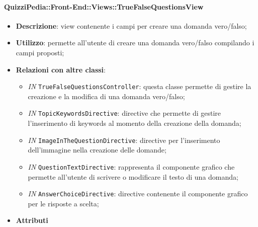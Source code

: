 \paragraph{QuizziPedia::Front-End::Views::TrueFalseQuestionsView}
\begin{itemize}
	\item \textbf{Descrizione}: view contenente i campi per creare una domanda vero/falso; 
	\item \textbf{Utilizzo}: permette all'utente di creare una domanda vero/falso compilando i campi proposti;
	\item \textbf{Relazioni con altre classi}:
	\begin{itemize}
		\item \textit{IN} \texttt{TrueFalseQuestionsController}: questa classe permette di gestire la creazione e la modifica di una domanda vero/falso;
		\item \textit{IN} \texttt{TopicKeywordsDirective}: directive che permette di gestire l'inserimento di keywords al momento della creazione della domanda;
		\item \textit{IN} \texttt{ImageInTheQuestionDirective}: directive per l'inserimento dell'immagine nella creazione delle domande;
		\item \textit{IN} \texttt{QuestionTextDirective}: rappresenta il componente grafico che permette all'utente di scrivere o modificare il testo di una domanda;
		\item \textit{IN} \texttt{AnswerChoiceDirective}: directive contenente il componente grafico per le risposte a scelta;  
	\end{itemize}
\item \textbf{Attributi}
\end{itemize}

